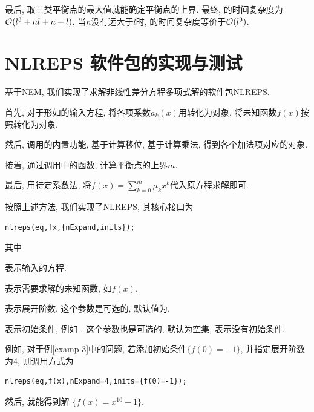 最后, 取三类平衡点的最大值就能确定平衡点的上界. 最终, 的时间复杂度为$\mathcal O(l^3+nl+n+l)$. 当$n$没有远大于$l$时, 的时间复杂度等价于$\mathcal O(l^3)$.

\section{NLREPS 软件包的实现与测试}\label{ch4sec4}

基于NEM, 我们实现了求解非线性差分方程多项式解的软件包NLREPS.
\begin{compactenum}[(1)]
\item 首先, 对于形如的输入方程, 将各项系数$a_k(x)$用转化为对象, 将未知函数$f(x)$按照转化为对象. 
\item 然后, 调用的内置功能, 基于计算移位, 基于计算乘法, 得到各个加法项对应的对象. 
\item 接着, 通过调用中的函数, 计算平衡点的上界$\overline{m}$.
\item 最后, 用待定系数法, 将$f(x)=\sum_{k=0}^{\overline{m}}{\mu_k x^k}$代入原方程求解即可. 
\end{compactenum}

按照上述方法, 我们实现了NLREPS, 其核心接口为
\begin{verbatim}
nlreps(eq,fx,{nExpand,inits});
\end{verbatim}
其中
\begin{compactitem}[\textbullet]
\item {} 表示输入的方程.
\item {} 表示需要求解的未知函数, 如$f(x)$.
\item {} 表示展开阶数. 这个参数是可选的, 默认值为. 
\item {} 表示初始条件, 例如 . 这个参数也是可选的, 默认为空集, 表示没有初始条件. 
\end{compactitem}

例如, 对于例\ref{examp-3}中的问题, 若添加初始条件$\{f(0)=-1\}$, 并指定展开阶数为4, 则调用方式为
\begin{verbatim}
nlreps(eq,f(x),nExpand=4,inits={f(0)=-1});
\end{verbatim}
然后, 就能得到解 $\{f(x)=x^{10}-1\}$.

